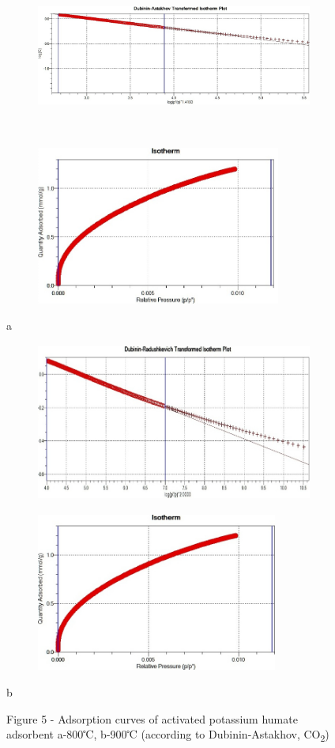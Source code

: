 \begin{figure}[H]
    \centering
    \begin{subfigure}[t]{0.45\textwidth}
        \centering
        \includegraphics[height=5.2cm]{media/chem2/image104}
    \end{subfigure}
    \begin{subfigure}[t]{0.45\textwidth}
        \centering
        \includegraphics[height=5.2cm]{media/chem2/image104.1}
    \end{subfigure}
    \caption*{a}
    
    \begin{subfigure}[t]{0.45\textwidth}
        \centering
        \includegraphics[height=5.2cm]{media/chem2/image105}
    \end{subfigure}
    \begin{subfigure}[t]{0.45\textwidth}
        \centering
        \includegraphics[height=5.2cm]{media/chem2/image106}
    \end{subfigure}
    \caption*{b}
    \caption*{Figure 5 - Adsorption curves of activated potassium humate adsorbent a-800℃, b-900℃ (according to Dubinin-Astakhov, CO\textsubscript{2})}
\end{figure}

